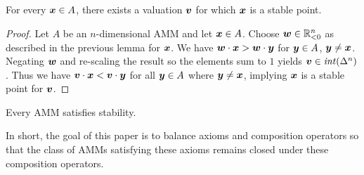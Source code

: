 \begin{lemma}
  For every ${\boldsymbol x} \in A$,
  there exists a valuation ${\boldsymbol v}$ for which ${\boldsymbol x}$ is a stable point.
\end{lemma}

\begin{proof}
    Let $A$ be an $n$-dimensional AMM and let ${\boldsymbol x} \in A$.
    Choose ${\boldsymbol w} \in \mathbb{R}_{<0}^n$ as described in the previous lemma for ${\boldsymbol x}$.
    We have ${\boldsymbol w} \cdot {\boldsymbol x} > {\boldsymbol w} \cdot {\boldsymbol y}$ for ${\boldsymbol y} \in A$, ${\boldsymbol y} \neq {\boldsymbol x}$.
    Negating ${\boldsymbol w}$ and re-scaling the result so the elements sum to $1$ yields
    ${\boldsymbol v} \in \mathit{int}(\Delta^n)$.
    Thus we have ${\boldsymbol v} \cdot {\boldsymbol x} < {\boldsymbol v} \cdot {\boldsymbol y}$ for all ${\boldsymbol y} \in A$ where ${\boldsymbol y} \neq {\boldsymbol x}$,
    implying ${\boldsymbol x}$ is a stable point for ${\boldsymbol v}$.
\end{proof}

\begin{corollary}
  Every AMM satisfies stability.
\end{corollary}

In short, the goal of this paper is to balance axioms and composition operators so that the class of AMMs satisfying
these axioms remains closed under these composition operators.